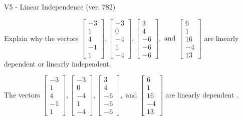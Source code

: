 \begin{exercise}
  \begin{exerciseTitle}V5 - Linear Independence (ver. 782)\end{exerciseTitle}
  \begin{exerciseStatement}
    Explain why the vectors \(\left[\begin{array}{r}
-3 \\
1 \\
4 \\
-1 \\
1
\end{array}\right] , \left[\begin{array}{r}
-3 \\
0 \\
-4 \\
1 \\
-4
\end{array}\right] , \left[\begin{array}{r}
3 \\
4 \\
-6 \\
-6 \\
-6
\end{array}\right] , \text{ and } \left[\begin{array}{r}
6 \\
1 \\
16 \\
-4 \\
13
\end{array}\right]\) are linearly dependent or linearly independent.	


  \end{exerciseStatement}
  \begin{exerciseAnswer}
   The vectors \(\left[\begin{array}{r}
-3 \\
1 \\
4 \\
-1 \\
1
\end{array}\right] , \left[\begin{array}{r}
-3 \\
0 \\
-4 \\
1 \\
-4
\end{array}\right] , \left[\begin{array}{r}
3 \\
4 \\
-6 \\
-6 \\
-6
\end{array}\right] , \text{ and } \left[\begin{array}{r}
6 \\
1 \\
16 \\
-4 \\
13
\end{array}\right]\) are 
  	 linearly dependent  .
  


  \end{exerciseAnswer}
\end{exercise}